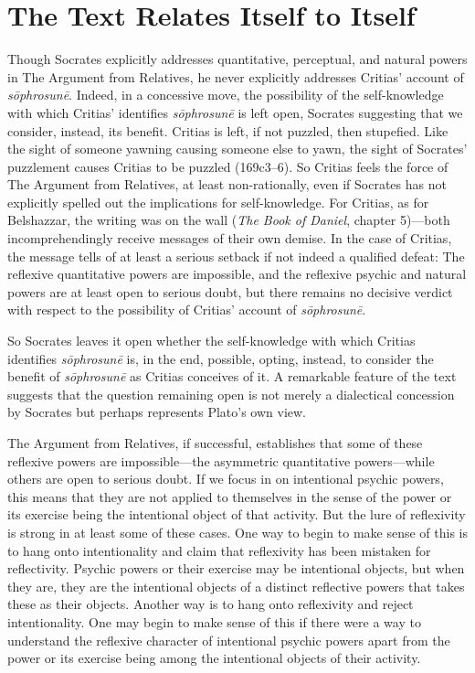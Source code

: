

\section{The Text Relates Itself to Itself} %
\label{sec:the_text_relates_itself_to_itself}

Though Socrates explicitly addresses quantitative, perceptual, and natural powers in The Argument from Relatives, he never explicitly addresses Critias' account of \emph{sōphrosunē}. Indeed, in a concessive move, the possibility of the self-knowledge with which Critias' identifies \emph{sōphrosunē} is left open, Socrates suggesting that we consider, instead, its benefit. Critias is left, if not puzzled, then stupefied. Like the sight of someone yawning causing someone else to yawn, the sight of Socrates' puzzlement causes Critias to be puzzled (169c3–6). So Critias feels the force of The Argument from Relatives, at least non-rationally, even if Socrates has not explicitly spelled out the implications for self-knowledge. For Critias, as for Belshazzar, the writing was on the wall (\emph{The Book of Daniel}, chapter 5)—both incomprehendingly receive messages of their own demise. In the case of Critias, the message tells of at least a serious setback if not indeed a qualified defeat: The reflexive quantitative powers are impossible, and the reflexive psychic and natural powers are at least open to serious doubt, but there remains no decisive verdict with respect to the possibility of Critias' account of \emph{sōphrosunē}.

So Socrates leaves it open whether the self-knowledge with which Critias identifies \emph{sōphrosunē} is, in the end, possible, opting, instead, to consider the benefit of \emph{sōphrosunē} as Critias conceives of it. A remarkable feature of the text suggests that the question remaining open is not merely a dialectical concession by Socrates but perhaps represents Plato's own view. 

The Argument from Relatives, if successful, establishes that some of these reflexive powers are impossible—the asymmetric quantitative powers—while others are open to serious doubt. If we focus in on intentional psychic powers, this means that they are not applied to themselves in the sense of the power or its exercise being the intentional object of that activity. But the lure of reflexivity is strong in at least some of these cases. One way to begin to make sense of this is to hang onto intentionality and claim that reflexivity has been mistaken for reflectivity. Psychic powers or their exercise may be intentional objects, but when they are, they are the intentional objects of a distinct reflective powers that takes these as their objects. Another way is to hang onto reflexivity and reject intentionality. One may begin to make sense of this if there were a way to understand the reflexive character of intentional psychic powers apart from the power or its exercise being among the intentional objects of their activity.

